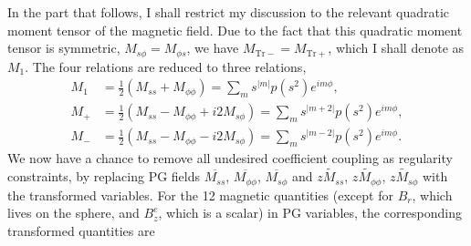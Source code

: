 In the part that follows, I shall restrict my discussion to the relevant quadratic moment tensor of the magnetic field. 
Due to the fact that this quadratic moment tensor is symmetric, $M_{s\phi} = M_{\phi s}$, we have $M_{\mathrm{Tr}-} = M_{\mathrm{Tr}+}$, which I shall denote as $M_1$.
The four relations are reduced to three relations,
%
\begin{equation}
    \begin{aligned}
        M_1 &= \frac{1}{2} \left(M_{ss} + M_{\phi\phi}\right) = \sum_{m} s^{|m|} p(s^2) e^{im\phi}, \\ 
        M_+ &= \frac{1}{2} \left(M_{ss} - M_{\phi\phi} + i 2M_{s\phi}\right) = \sum_{m} s^{|m + 2|} p(s^2) e^{im\phi}, \\ 
        M_- &= \frac{1}{2} \left(M_{ss} - M_{\phi\phi} - i 2M_{s\phi}\right) = \sum_{m} s^{|m - 2|} p(s^2) e^{im\phi}.
    \end{aligned}
\end{equation}
%
We now have a chance to remove all undesired coefficient coupling as regularity constraints, by replacing PG fields $\overline{M_{ss}}$, $\overline{M_{\phi\phi}}$, $\overline{M_{s\phi}}$ and $\widetilde{zM_{ss}}$, $\widetilde{zM_{\phi\phi}}$, $\widetilde{zM_{s\phi}}$ with the transformed variables.
For the 12 magnetic quantities (except for $B_r$, which lives on the sphere, and $B_{z}^e$, which is a scalar) in PG variables, the corresponding transformed quantities are
%
